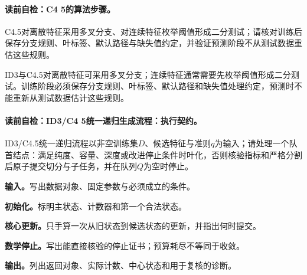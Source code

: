\paragraph{读前自检：C4 5的算法步骤。}C4.5对离散特征采用多叉分支、对连续特征枚举阈值形成二分测试；请核对训练后保存分支规则、叶标签、默认路径与缺失值约定，并验证预测阶段不从测试数据重估这些规则。\par

ID3与C4.5对离散特征可采用多叉分支；连续特征通常需要先枚举阈值形成二分测试。训练阶段必须保存分支规则、叶标签、默认路径和缺失值处理约定，预测时不能重新从测试数据估计这些规则。

\label{struct:V2-C04-CH19}
\label{struct:V2-C04-CH20}
\paragraph{读前自检：ID3/C4 5统一递归生成流程：执行契约。}ID3/C4.5统一递归流程以非空训练集$D$、候选特征与准则$q$为输入；请处理一个队首结点：满足纯度、容量、深度或改进停止条件时叶化，否则核验指标和严格分割后原子提交切分与子任务，并在队列$Q$为空时停止。\par
\begin{keypointbox}[title={ID3/C4.5统一递归生成流程：五步阅读}]
\textbf{输入。}写出数据对象、固定参数与必须成立的条件。\par
\textbf{初始化。}标明主状态、计数器和第一个合法状态。\par
\textbf{核心更新。}只手算一次从旧状态到候选状态的更新，并指出何时提交。\par
\textbf{数学停止。}写出能直接核验的停止证书；预算耗尽不等同于收敛。\par
\textbf{输出。}列出返回对象、实际计数、中心状态和用于复核的诊断。
\end{keypointbox}


